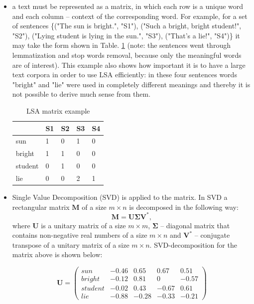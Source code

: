 \begin{itemize}
\item a text must be represented as a matrix, in which each row is a unique word and each column -- context of the corresponding word. For example, for a set of sentences \{("The sun is bright.", "S1"), ("Such a bright, bright student!", "S2"), ("Lying student is lying in the sun.", "S3"), ("That's a lie!", "S4")\} it may take the form shown in Table. \ref{LSA} (note: the sentences went through lemmatization and stop words removal, because only the meaningful words are of interest). This example also shows how important it is to have a large text corpora in order to use LSA efficiently: in these four sentences words "bright" and "lie" were used in completely different meanings and thereby it is not possible to derive much sense from them.
\begin{table}[h!]
\centering
\caption{LSA matrix example}
\label{LSA}
\begin{tabular}{|l|l|l|l|l|}
\hline
        & S1 & S2 & S3 & S4 \\ \hline
sun     & 1 & 0 & 1 & 0 \\ \hline
bright  & 1 & 1 & 0 & 0 \\ \hline
student & 0 & 1 & 0 & 0 \\ \hline
lie     & 0 & 0 & 2 & 1 \\ \hline
\end{tabular}
\end{table}

\item Single Value Decomposition (SVD) is applied to the matrix. In SVD a rectangular matrix $\boldsymbol{M}$ of a size $m \times n$ is decomposed in the following way:
\begin{equation} \label{eq:SVD}
\boldsymbol{M} = \boldsymbol{U \Sigma V^*}, 
\end{equation}
where $\boldsymbol U$ is a unitary matrix of a size $m \times m$, $\boldsymbol{\Sigma}$ -- diagonal matrix that contains non-negative real numbers of a size $m \times n$ and $\boldsymbol{V^*}$ -- conjugate transpose of a unitary matrix  of a size $m \times n$. SVD-decomposition for the matrix above is shown below:

\begin{equation} \label{eq:U}
\boldsymbol U = \begin{pmatrix}
sun & -0.46 & 0.65 & 0.67 & 0.51 \\
bright & -0.12 & 0.81 & 0 & -0.57 \\
student & -0.02 & 0.43 & -0.67 & 0.61 \\
lie & -0.88 & -0.28 & -0.33 & -0.21
\end{pmatrix}
\end{equation}


\end{itemize}
